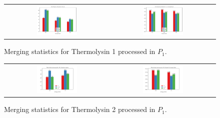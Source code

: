 \begin{figure}[]
    \centering
    \begin{tabular}{cc}
    \includegraphics[width = 0.4\textwidth]{plots/exp1/tlys_9_P1/I_over_sigma.png} & \includegraphics[width = 0.4\textwidth]{plots/exp1/tlys_9_P1/rmerges.png}
    \end{tabular}
    \caption{Merging statistics for Thermolysin 1 processed in $P_1$.}
    \label{fig:tlys_9_p1}
\end{figure}

\begin{figure}[]
    \centering
    \begin{tabular}{cc}
    \includegraphics[width = 0.4\textwidth]{plots/exp1/tlys_2_P1/I_over_sigma.png} & \includegraphics[width = 0.4\textwidth]{plots/exp1/tlys_2_P1/rmerges.png}
    \end{tabular}
    \caption{Merging statistics for Thermolysin 2 processed in $P_1$.}
    \label{fig:tlys_2_p1}
\end{figure}




